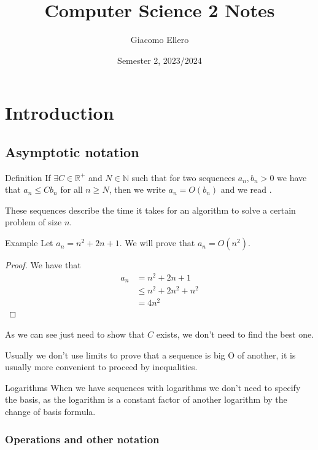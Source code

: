 \documentclass[12pt]{extarticle}
\title{Computer Science 2 Notes}
\author{Giacomo Ellero}
\date{Semester 2, 2023/2024}
\newcommand{\R}{\mathbb{R}}
\newcommand{\N}{\mathbb{N}}
\begin{document}
\maketitle
\tableofcontents
\clearpage

\section{Introduction}

\subsection{Asymptotic notation}

\begin{bluebox}{Definition}
    If $\exists C \in \R^+$ and $N \in \N$ such that for two sequences $a_n, b_n > 0$
    we have that $a_n \leq Cb_n$ for all $n \geq N$, then we write $a_n = O(b_n)$ and we read .
\end{bluebox}

These sequences describe the time it takes for an algorithm to solve a certain problem of size $n$.

\begin{examplebox}{Example}
    Let $a_n = n^2 + 2n + 1$. We will prove that $a_n = O(n^2)$.

    \begin{proof}
        We have that
        \begin{align*}
            a_n & = n^2 + 2n + 1        \\
                & \leq n^2 + 2n^2 + n^2 \\
                & = 4n^2
        \end{align*}
    \end{proof}

    As we can see just need to show that $C$ exists, we don't need to find the best one.
\end{examplebox}

Usually we don't use limits to prove that a sequence is big O of another, it is usually more convenient to proceed by inequalities.

\begin{notebox}{Logarithms}
    When we have sequences with logarithms we don't need to specify the basis,
    as the logarithm is a constant factor of another logarithm by the change of basis formula.
\end{notebox}

\subsubsection{Operations and other notation}
\end{document}
